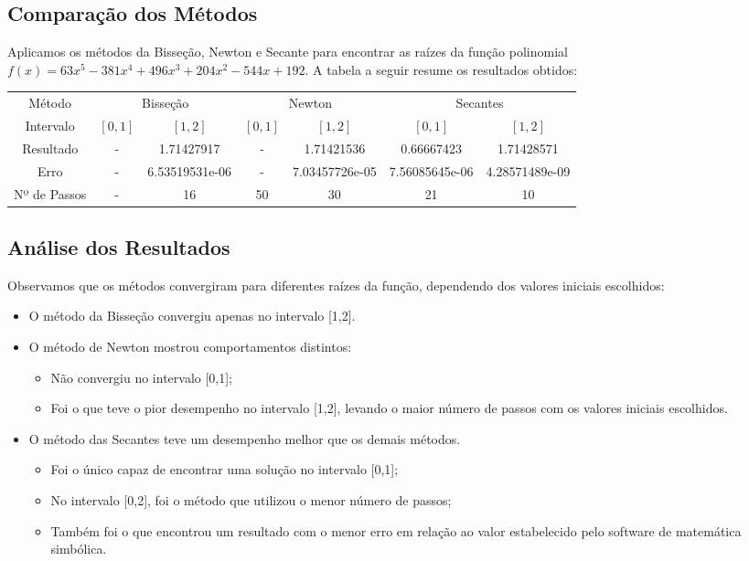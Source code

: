 \documentclass{article}
\begin{document}
\subsection{Compara\c{c}\~{a}o dos M\'{e}todos}
Aplicamos os m\'{e}todos da Bisse\c{c}\~{a}o, Newton e Secante para encontrar as ra\'{i}zes da fun\c{c}\~{a}o polinomial $f(x) = 63x^5 - 381x^4 + 496x^3 + 204x^2 - 544x + 192$. A tabela a seguir resume os resultados obtidos:

\begin{center}
\begin{tabular}{| c | c | c | c | c | c | c |}
\hline
Método & \multicolumn{2}{c|}{Bisseção}&\multicolumn{2}{c|}{Newton}&\multicolumn{2}{c|}{Secantes}\\

 Intervalo & $[0,1]$ & $[1,2]$ & $[0,1]$ & $[1,2]$& $[0,1]$ & $[1,2]$ \\
\hline

Resultado & - & 1.71427917 & - & 1.71421536 & 0.66667423 & 1.71428571\\
Erro & - & 6.53519531e-06 & - & 7.03457726e-05 & 7.56085645e-06 & 4.28571489e-09\\
Nº de Passos & - & 16 & 50 & 30 & 21 & 10 \\
\hline
\end{tabular}
\end{center}

\subsection{An\'{a}lise dos Resultados}

Observamos que os m\'{e}todos convergiram para diferentes ra\'{i}zes da fun\c{c}\~{a}o, dependendo dos valores iniciais escolhidos:


\begin{itemize}
    \item O m\'{e}todo da Bisse\c{c}\~{a}o convergiu apenas no intervalo [1,2].
    \item O m\'{e}todo de Newton mostrou comportamentos distintos:
    \begin{itemize}
        \item Não convergiu no intervalo [0,1];
        \item Foi o que teve o pior desempenho no intervalo [1,2], levando o maior número de passos com os valores iniciais escolhidos.
    \end{itemize}
    \item O m\'{e}todo das Secantes teve um desempenho melhor que os demais métodos.
    \begin{itemize}
        \item Foi o único capaz de encontrar uma solução no intervalo [0,1];
        \item No intervalo [0,2], foi o método que utilizou o menor número de passos;
        \item Também foi o que encontrou um resultado com o menor erro em relação ao valor estabelecido pelo software de matemática simbólica.
    \end{itemize}
\end{itemize}
\end{document}

